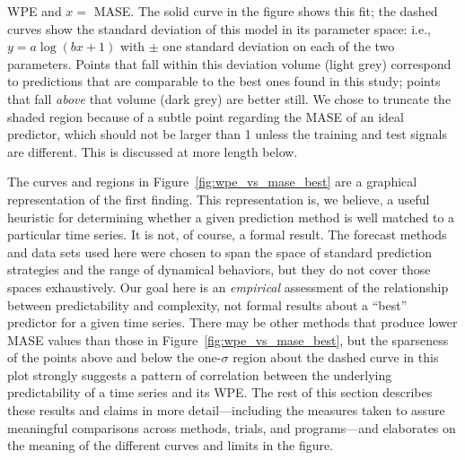 \documentclass[%
pre,
reprint,
superscriptaddress,
showpacs,
nofootinbib,
nobibnotes,
 amsmath,amssymb,
 aps,
]{revtex4-1}
\begin{document}
WPE and $x=$ MASE.  The solid curve in the figure shows this fit; the
dashed curves show the standard deviation of this model in its
parameter space: i.e., $y = a \log(b x + 1)$ with $\pm$ one standard
deviation on each of the two parameters.  Points that fall within this
deviation volume (light grey) correspond to predictions that are
comparable to the best ones found in this study; points that fall
\emph{above} that volume (dark grey) are better still.  We chose to
truncate the shaded region because of a subtle point regarding the
MASE of an ideal predictor, which should not be larger than 1 unless
the training and test signals are different.  This is discussed at
more length below.

The curves and regions in Figure~\ref{fig:wpe_vs_mase_best} are a
graphical representation of the first finding.  This representation
is, we believe, a useful heuristic for determining whether a given
prediction method is well matched to a particular time series.  It is
not, of course, a formal result.  The forecast methods and data sets
used here were chosen to span the space of standard prediction
strategies and the range of dynamical behaviors, but they do not cover
those spaces exhaustively.  Our goal here is an \emph{empirical}
assessment of the relationship between predictability and complexity,
not formal results about a ``best'' predictor for a given time series.
There may be other methods that produce lower MASE values than those
in Figure~\ref{fig:wpe_vs_mase_best}, but the sparseness of the points
above and below the one-$\sigma$ region about the dashed curve in this
plot strongly suggests a pattern of correlation between the underlying
predictability of a time series and its WPE.  The rest of this section
describes these results and claims in more detail---including the
measures taken to assure meaningful comparisons across methods,
trials, and programs---and elaborates on the meaning of the different
curves and limits in the figure.
\end{document}
